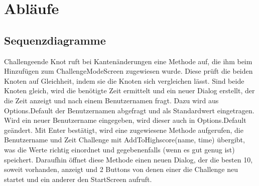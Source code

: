 \chapter{Abläufe}

\section{Sequenzdiagramme}
Challengeende
Knot ruft bei Kantenänderungen eine Methode auf, die ihm beim Hinzufügen zum ChallengeModeScreen zugewiesen wurde.
Diese prüft die beiden Knoten auf Gleichheit, indem sie die Knoten sich vergleichen lässt.
Sind beide Knoten gleich, wird die benötigte Zeit ermittelt und ein neuer Dialog erstellt, der die Zeit anzeigt und nach einem Benutzernamen fragt.
Dazu wird aus Options.Default der Benutzernamen abgefragt und als Standardwert eingetragen.
Wird ein neuer Benutzername eingegeben, wird dieser auch in Options.Default geändert.
Mit Enter bestätigt, wird eine zugewiesene Methode aufgerufen, die Benutzername und Zeit Challenge mit AddToHighscore(name, time) übergibt, was die Werte richtig einordnet und gegebenenfalls (wenn es gut genug ist) speichert.
Daraufhin öffnet diese Methode einen neuen Dialog, der die besten 10, soweit vorhanden, anzeigt und 2 Buttons von denen einer die Challenge neu startet und ein anderer den StartScreen aufruft.